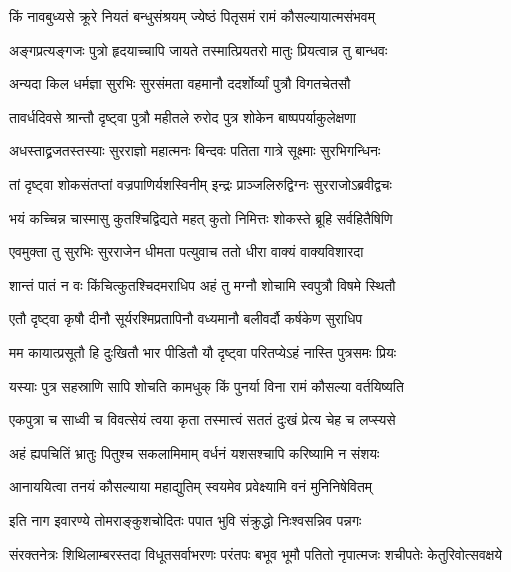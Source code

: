 \twolineshloka
{किं नावबुध्यसे क्रूरे नियतं बन्धुसंश्रयम्}
{ज्येष्ठं पितृसमं रामं कौसल्यायात्मसंभवम्} %

\twolineshloka
{अङ्गप्रत्यङ्गजः पुत्रो हृदयाच्चापि जायते}
{तस्मात्प्रियतरो मातुः प्रियत्वान्न तु बान्धवः} %

\twolineshloka
{अन्यदा किल धर्मज्ञा सुरभिः सुरसंमता}
{वहमानौ ददर्शोर्व्यां पुत्रौ विगतचेतसौ} %

\twolineshloka
{तावर्धदिवसे श्रान्तौ दृष्ट्वा पुत्रौ महीतले}
{रुरोद पुत्र शोकेन बाष्पपर्याकुलेक्षणा} %

\twolineshloka
{अधस्ताद्व्रजतस्तस्याः सुरराज्ञो महात्मनः}
{बिन्दवः पतिता गात्रे सूक्ष्माः सुरभिगन्धिनः} %

\twolineshloka
{तां दृष्ट्वा शोकसंतप्तां वज्रपाणिर्यशस्विनीम्}
{इन्द्रः प्राञ्जलिरुद्विग्नः सुरराजोऽब्रवीद्वचः} %

\twolineshloka
{भयं कच्चिन्न चास्मासु कुतश्चिद्विद्यते महत्}
{कुतो निमित्तः शोकस्ते ब्रूहि सर्वहितैषिणि} %

\twolineshloka
{एवमुक्ता तु सुरभिः सुरराजेन धीमता}
{पत्युवाच ततो धीरा वाक्यं वाक्यविशारदा} %

\twolineshloka
{शान्तं पातं न वः किंचित्कुतश्चिदमराधिप}
{अहं तु मग्नौ शोचामि स्वपुत्रौ विषमे स्थितौ} %

\twolineshloka
{एतौ दृष्ट्वा कृषौ दीनौ सूर्यरश्मिप्रतापिनौ}
{वध्यमानौ बलीवर्दौ कर्षकेण सुराधिप} %

\twolineshloka
{मम कायात्प्रसूतौ हि दुःखितौ भार पीडितौ}
{यौ दृष्ट्वा परितप्येऽहं नास्ति पुत्रसमः प्रियः} %

\twolineshloka
{यस्याः पुत्र सहस्राणि सापि शोचति कामधुक्}
{किं पुनर्या विना रामं कौसल्या वर्तयिष्यति} %

\twolineshloka
{एकपुत्रा च साध्वी च विवत्सेयं त्वया कृता}
{तस्मात्त्वं सततं दुःखं प्रेत्य चेह च लप्स्यसे} %

\twolineshloka
{अहं ह्यपचितिं भ्रातुः पितुश्च सकलामिमाम्}
{वर्धनं यशसश्चापि करिष्यामि न संशयः} %

\twolineshloka
{आनाययित्वा तनयं कौसल्याया महाद्युतिम्}
{स्वयमेव प्रवेक्ष्यामि वनं मुनिनिषेवितम्} %

\twolineshloka
{इति नाग इवारण्ये तोमराङ्कुशचोदितः}
{पपात भुवि संक्रुद्धो निःश्वसन्निव पन्नगः} %

\fourlineindentedshloka
{संरक्तनेत्रः शिथिलाम्बरस्तदा}
{ विधूतसर्वाभरणः परंतपः}
{बभूव भूमौ पतितो नृपात्मजः}
{ शचीपतेः केतुरिवोत्सवक्षये} %


